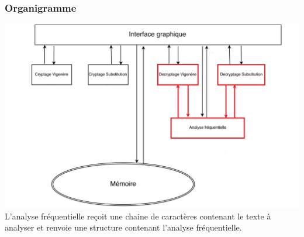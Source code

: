 \documentclass[10pt,xcolor=table]{beamer}
\begin{document}
\begin{frame}
  \frametitle{Organigramme}
\includegraphics[scale = 0.28]{Org10.jpg}\\
L'analyse fréquentielle reçoit une chaine de caractères contenant le texte 
à analyser et renvoie une structure contenant l'analyse fréquentielle.
\end{frame}
\end{document}
